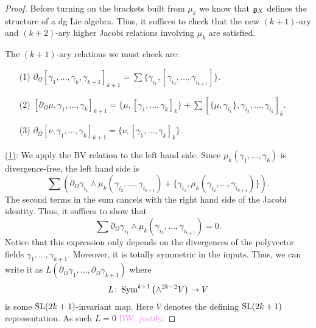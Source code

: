 \documentclass[11pt]{amsart}
\numberwithin{equation}{section}
\def\brian{\textcolor{violet}{BW: }\textcolor{violet}}
\def\div{\partial_\Omega}
\begin{document}
\begin{proof}
Before turning on the brackets built from $\mu_k$ we know that $\mathfrak g_X$ defines the structure of a dg Lie algebra.
Thus, it suffices to check that the new $(k+1)$-ary and $(k+2)$-ary higher Jacobi relations involving $\mu_k$ are satisfied. 

The $(k+1)$-ary relations we must check are:
\begin{itemize}
\item[(1)] $\div [\gamma_1,\ldots, \gamma_k,\gamma_{k+1}]_{k+1} = \sum \{\gamma_{i_1}, [\gamma_{i_2},\ldots, \gamma_{i_{k+1}}]\}$. 
\item[(2)] $[\div \mu, \gamma_1, \ldots, \gamma_k]_{k+1} = \{\mu, [\gamma_1,\ldots, \gamma_k]_k\} + \sum [\{\mu, \gamma_{i_1}\}, \gamma_{i_2}, \ldots, \gamma_{i_{k}}]_{k}$.
\item[(3)] $\div [\nu,\gamma_1,\ldots, \gamma_k]_{k+1} = \{\nu, [\gamma_1,\ldots, \gamma_{k}]_k\}$.
\end{itemize}

\ul{(1)}:
We apply the BV relation to the left hand side.
Since $\mu_k(\gamma_1,\ldots,\gamma_k)$ is divergence-free, the left hand side is
\[
\sum \left(\div \gamma_{i_1} \wedge \mu_k(\gamma_{i_2}, \ldots, \gamma_{i_{k+1}}) + \{\gamma_{i_1}, \mu_k(\gamma_{i_2},\ldots, \gamma_{i_{k+1}})\} \right) .
\]
The second terms in the sum cancels with the right hand side of the Jacobi identity.
Thus, it suffices to show that 
\[
\sum \div \gamma_{i_1} \wedge \mu_k(\gamma_{i_2}, \ldots, \gamma_{i_{k+1}}) = 0 .
\]
Notice that this expression only depends on the divergences of the polyvector fields $\gamma_1,\ldots, \gamma_{k+1}$. 
Moreover, it is totally symmetric in the inputs. 
Thus, we can write it as $L(\div \gamma_1,\ldots, \div \gamma_{k+1})$ where
\[
L \colon \operatorname{Sym}^{k+1} \left(\wedge^{2k-2} V \right) \to V
\]
is some ${\rm SL}(2k+1)$-invariant map. 
Here $V$ denotes the defining ${\rm SL}(2k+1)$ representation.
As such $L= 0$ \brian{justify}.


\end{proof}
\end{document}
